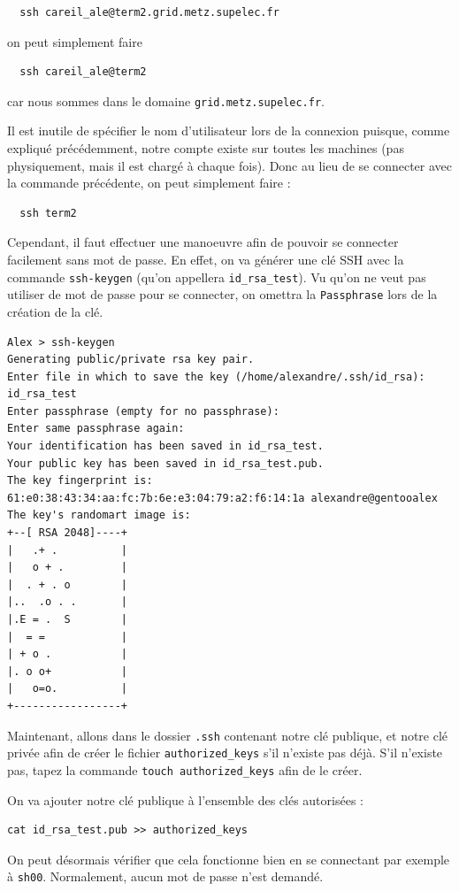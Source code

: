 \begin{verbatim}
  ssh careil_ale@term2.grid.metz.supelec.fr
\end{verbatim}
 on peut simplement faire
\begin{verbatim}
  ssh careil_ale@term2
\end{verbatim}

car nous sommes dans le domaine \texttt{grid.metz.supelec.fr}.

 Il est inutile de spécifier le nom d'utilisateur lors de la connexion puisque, comme expliqué précédemment, notre compte existe sur toutes les machines (pas physiquement, mais il est chargé à chaque fois). Donc au lieu de se connecter avec la commande précédente, on peut simplement faire :
 
\begin{verbatim}
  ssh term2
\end{verbatim}

Cependant, il faut effectuer une manoeuvre afin de pouvoir se connecter facilement sans mot de passe. En effet, on va générer une clé SSH avec la commande \texttt{ssh-keygen} (qu'on appellera \texttt{id\_rsa\_test}). Vu qu'on ne veut pas utiliser de mot de passe pour se connecter, on omettra la \texttt{Passphrase} lors de la création de la clé.

\begin{verbatim}
Alex > ssh-keygen
Generating public/private rsa key pair.
Enter file in which to save the key (/home/alexandre/.ssh/id_rsa): 
id_rsa_test
Enter passphrase (empty for no passphrase): 
Enter same passphrase again: 
Your identification has been saved in id_rsa_test.
Your public key has been saved in id_rsa_test.pub.
The key fingerprint is:
61:e0:38:43:34:aa:fc:7b:6e:e3:04:79:a2:f6:14:1a alexandre@gentooalex
The key's randomart image is:
+--[ RSA 2048]----+
|   .+ .          |
|   o + .         |
|  . + . o        |
|..  .o . .       |
|.E = .  S        |
|  = =            |
| + o .           |
|. o o+           |
|   o=o.          |
+-----------------+
\end{verbatim}

\par Maintenant, allons dans le dossier \texttt{.ssh} contenant notre clé publique, et notre clé privée afin de créer le fichier \texttt{authorized\_keys} s'il n'existe pas déjà. S'il n'existe pas, tapez la commande \texttt{touch authorized\_keys} afin de le créer.

\par On va ajouter notre clé publique à l'ensemble des clés autorisées :
\begin{verbatim}
cat id_rsa_test.pub >> authorized_keys
\end{verbatim}
\par On peut désormais vérifier que cela fonctionne bien en se connectant par exemple à \texttt{sh00}. Normalement, aucun mot de passe n'est demandé. 

